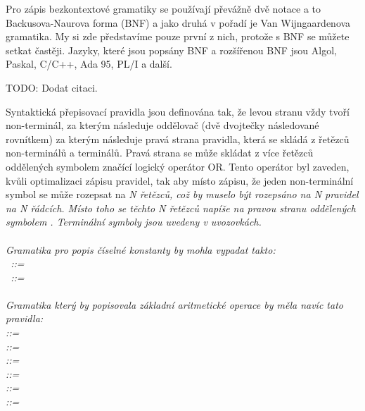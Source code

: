 Pro zápis bezkontextové gramatiky se používají převážně dvě notace a to Backusova-Naurova forma (BNF) a jako druhá v pořadí je Van Wijngaardenova gramatika. My si zde představíme pouze první z nich, protože s BNF se můžete setkat častěji. Jazyky, které jsou popsány BNF a rozšířenou BNF jsou Algol, Paskal, C/C++, Ada 95, PL/I a další. 

TODO: Dodat citaci.

Syntaktická přepisovací pravidla jsou definována tak, že levou stranu vždy tvoří non-terminál, za kterým následuje oddělovač \uv{::=} (dvě dvojtečky následované rovnítkem) za kterým následuje pravá strana pravidla, která se skládá z řetězců non-terminálů a terminálů. Pravá strana se může skládat z více řetězců oddělených symbolem \uv{\textbar} značící logický operátor OR. Tento operátor byl zaveden, kvůli optimalizaci zápisu pravidel, tak aby místo zápisu, že jeden non-terminální symbol se může rozepsat na \it{N} řetězců, což by muselo být rozepsáno na \it{N} pravidel na \it{N} řádcích. Místo toho se těchto \it{N} řetězců napíše na pravou stranu oddělených symbolem \uv{\textbar}. Terminální symboly jsou uvedeny v uvozovkách.
\cite{BCF}
\\
\\
Gramatika pro popis číselné konstanty by mohla vypadat takto:\\
~::= ~\textbar~  \\
~::=~~\textbar~~\textbar~~\textbar~~\textbar~~
\textbar~~\textbar~~\textbar~~\textbar~~\textbar~ \\
\\
Gramatika který by popisovala základní aritmetické operace by měla navíc tato pravidla:\\
 ::=  \uv{+}  \\
 ::=  \uv{-}  \\
 ::=  \uv{\(\times\)}  \\
 ::=  \uv{/}  \\
 ::= \uv{(}  \uv{)} \\
 ::= \\


